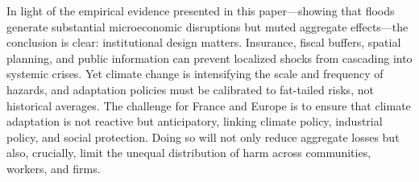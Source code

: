 In light of the empirical evidence presented in this paper—showing that floods generate substantial microeconomic disruptions but muted aggregate effects—the conclusion is clear: institutional design matters. Insurance, fiscal buffers, spatial planning, and public information can prevent localized shocks from cascading into systemic crises. Yet climate change is intensifying the scale and frequency of hazards, and adaptation policies must be calibrated to fat-tailed risks, not historical averages. The challenge for France and Europe is to ensure that climate adaptation is not reactive but anticipatory, linking climate policy, industrial policy, and social protection. Doing so will not only reduce aggregate losses but also, crucially, limit the unequal distribution of harm across communities, workers, and firms.



















